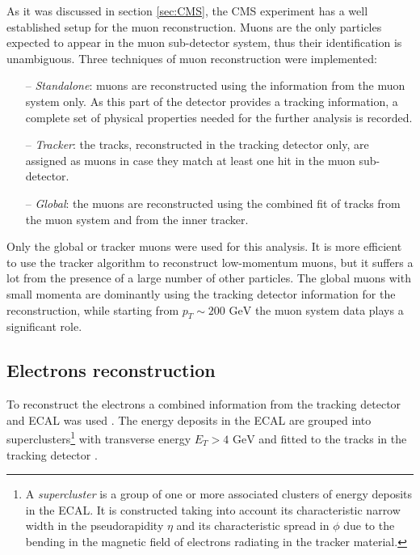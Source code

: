 As it was discussed in section \ref{sec:CMS}, the CMS experiment has a well established setup for the muon reconstruction.
Muons are the only particles expected to appear in the muon sub-detector system, thus their identification is unambiguous.
Three techniques of muon reconstruction were implemented:

\begin{itemize}
 \item [--] \textit{Standalone}: muons are reconstructed using the information from the muon system only. As 
 this part of the detector provides a tracking information, a complete set of physical properties needed for the further
 analysis is recorded.
 
 \item [--] \textit{Tracker}: the tracks, reconstructed in the tracking detector only, are assigned as muons in case they 
 match at least one hit in the muon sub-detector. 
 
 \item [--] \textit{Global}: the muons are reconstructed using 
 the combined fit of tracks from the muon system and from the inner tracker.
\end{itemize}

Only the global or tracker muons were used for this analysis. It is more efficient to use the tracker algorithm to reconstruct
low-momentum muons, but it suffers a lot from the presence of a large number of other particles. The global muons with small momenta
are dominantly using the tracking detector information for the reconstruction, while starting from $p_{T} \sim \textrm{200 GeV}$
the muon system data plays a significant role.

\subsection{Electrons reconstruction}\label{ssec:ElRec}

To reconstruct the electrons a combined information from the tracking detector and ECAL was used \cite{CMS-PAS-EGM-10-004}. The energy
deposits in the ECAL are grouped into superclusters\footnote{A \textit{supercluster} is  a group of one or more associated clusters 
of energy deposits in the ECAL. It is constructed taking into account its characteristic narrow width in the pseudorapidity $\eta$
and its characteristic spread in $\phi$ due to the bending in the magnetic field of electrons radiating in the tracker material.} 
with transverse energy $E_{T} > \textrm{4 GeV}$ and fitted to the tracks in the tracking detector \cite{GSF_Electron_Reconstruction_CMS}.

